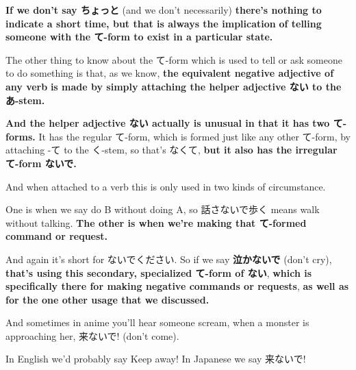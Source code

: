 \thinrule

{\bf If we don't say ちょっと} (and we don't necessarily) {\bf there's nothing to indicate a short time, but that is always the implication} {\bf of telling someone with the て-form to exist in a particular state.}

\startsectionlevel[title={て-form with ない helper adjective},reference={て-form-with-ない-helper-adjective}]

The other thing to know about the て-form which is used to tell or ask someone to do something is that, as we know, {\bf the equivalent negative adjective of any verb} {\bf is made by simply attaching the helper adjective ない to the あ-stem.}

{\bf And the helper adjective ない actually is unusual in that it has two て-forms.} It has the regular て-form, which is formed just like any other て-form, by attaching -て to the く-stem, so that's なくて, {\bf but it also has the irregular て-form ないで.}

{}

And when attached to a verb this is only used in two kinds of circumstance.

\startsectionlevel[title={ないで - irregular て-form of ない},reference={ないで---irregular-て-form-of-ない}]

One is when we say do B without doing A, so 話さないで歩く means walk without talking. {\bf The other is when we're making that て-formed command or request.}

And again it's short for ないでください. So if we say {\bf 泣かないで} (don't cry), {\bf that's using this secondary, specialized て-form of ない}, {\bf which is specifically there for making negative commands or requests}, {\bf as well as for the one other usage that we discussed.}

And sometimes in anime you'll hear someone scream, when a monster is approaching her, 来ないで! (don't come).

{}

In English we'd probably say Keep away! In Japanese we say 来ないで!

{}

\stopsectionlevel

\stopsectionlevel

\stopsectionlevel

\startsectionlevel[title={なさい},reference={なさい}]

